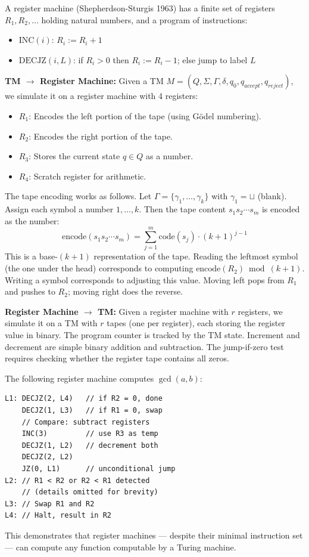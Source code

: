 A register machine (Shepherdson-Sturgis 1963) has a finite set of registers $R_1, R_2, \dots$ holding natural numbers, and a program of instructions:
\begin{itemize}
\item $\text{INC}(i)$: $R_i := R_i + 1$
\item $\text{DECJZ}(i, L)$: if $R_i > 0$ then $R_i := R_i - 1$; else jump to label $L$
\end{itemize}

\textbf{TM $\to$ Register Machine:} Given a TM $M = (Q, \Sigma, \Gamma, \delta, q_0, q_{accept}, q_{reject})$, we simulate it on a register machine with 4 registers:
\begin{itemize}
\item $R_1$: Encodes the left portion of the tape (using G\"odel numbering).
\item $R_2$: Encodes the right portion of the tape.
\item $R_3$: Stores the current state $q \in Q$ as a number.
\item $R_4$: Scratch register for arithmetic.
\end{itemize}

The tape encoding works as follows. Let $\Gamma = \{\gamma_1, \ldots, \gamma_k\}$ with $\gamma_1 = \sqcup$ (blank). Assign each symbol a number $1,\ldots,k$. Then the tape content $s_1 s_2 \cdots s_m$ is encoded as the number:
\[
\text{encode}(s_1 s_2 \cdots s_m) = \sum_{j=1}^m \text{code}(s_j) \cdot (k+1)^{j-1}
\]
This is a base-$(k+1)$ representation of the tape. Reading the leftmost symbol (the one under the head) corresponds to computing $\text{encode}(R_2) \bmod (k+1)$. Writing a symbol corresponds to adjusting this value. Moving left pops from $R_1$ and pushes to $R_2$; moving right does the reverse.

\textbf{Register Machine $\to$ TM:} Given a register machine with $r$ registers, we simulate it on a TM with $r$ tapes (one per register), each storing the register value in binary. The program counter is tracked by the TM state. Increment and decrement are simple binary addition and subtraction. The jump-if-zero test requires checking whether the register tape contains all zeros.

\begin{example}
The following register machine computes $\gcd(a,b)$:
\begin{verbatim}
L1: DECJZ(2, L4)   // if R2 = 0, done
    DECJZ(1, L3)   // if R1 = 0, swap
    // Compare: subtract registers
    INC(3)         // use R3 as temp
    DECJZ(1, L2)   // decrement both
    DECJZ(2, L2)
    JZ(0, L1)      // unconditional jump
L2: // R1 < R2 or R2 < R1 detected
    // (details omitted for brevity)
L3: // Swap R1 and R2
L4: // Halt, result in R2
\end{verbatim}
This demonstrates that register machines --- despite their minimal instruction set --- can compute any function computable by a Turing machine.
\end{example}

